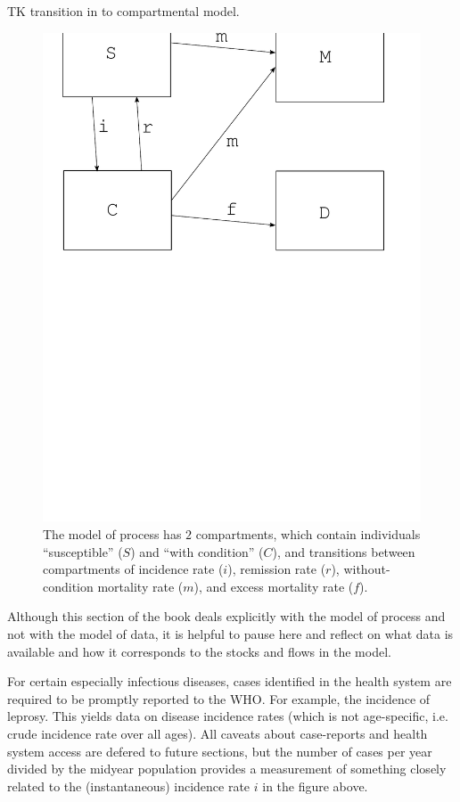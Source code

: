 TK transition in to compartmental model.

\begin{figure}
\begin{center}
\includegraphics[width=\textwidth]{compartments.pdf}
\end{center}
\caption{The model of process has $2$ compartments, which contain
individuals ``susceptible'' ($S$)  and ``with condition'' ($C$),
and transitions between compartments of incidence rate ($i$), remission
  rate ($r$), without-condition mortality rate ($m$), and excess
  mortality rate ($f$).}
\label{fig:compartmental-model}
\end{figure}

Although this section of the book deals explicitly with the model of
process and not with the model of data, it is helpful to pause here
and reflect on what data is available and how it corresponds to the
stocks and flows in the model.

For certain especially infectious diseases, cases identified in the
health system are required to be promptly reported to the WHO.  For
example, the incidence of leprosy.  This yields data on disease
incidence rates (which is not age-specific, i.e. crude incidence rate
over all ages).  All caveats about case-reports and health system
access are defered to future sections, but the number of cases per
year divided by the midyear population provides a measurement of
something closely related to the (instantaneous) incidence rate $i$ in
the figure above.


